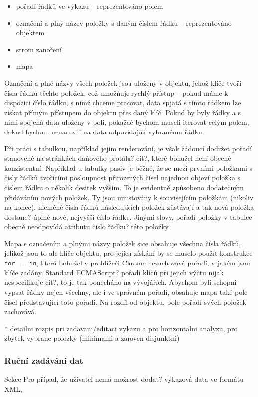 \begin{itemize}
\item pořadí řádků ve výkazu -- reprezentováno polem
\item označení a plný název položky s daným číslem řádku -- reprezentováno objektem
\item strom zanoření
\item mapa 
\end{itemize} 

Označení a plné názvy všech položek jsou uloženy v objektu, jehož klíče tvoří čísla řádků těchto položek, což umožňuje rychlý přístup -- pokud máme k dispozici číslo řádku, s nímž chceme pracovat, data spjatá s tímto řádkem lze získat přímým přístupem do objektu přes daný klíč. Pokud by byly řádky a s nimi spojená data uloženy v poli, pokaždé bychom museli iterovat celým polem, dokud bychom nenarazili na data odpovídající vybranému řádku.

Při práci s tabulkou, například jejím renderování, je však žádoucí dodržet pořadí stanovené na stránkách daňového protálu? cit?, které bohužel není obecně konzistentní. Například u tabulky pasiv je běžné, že se mezi prvními položkami s čísly řádků tvořícími posloupnost přirozených čísel najednou objeví položka s číslem řádku o několik desitek vyšším. To je evidentně způsobeno dodatečným přidáváním nových položek. Ty jsou umisťovány k souvisejícím položkám (nikoliv na konec), nicméně čísla řádků následujících položek zůstávají a tak nová položka dostane? úplně nové, nejvyšší číslo řádku. Jinými slovy, pořadí položky v tabulce obecně neodpovídá atributu číslo řádku? této položky. 


Mapa s označením a plnými názvy položek sice obsahuje všechna čísla řádků, jelikož jsou to ale klíče objektu, pro jejich získání by se muselo použít konstrukce \texttt{for .. in}, která bohužel v prohlížeči Chrome nezachovává pořadí, v jakém jsou klíče zadány. Standard ECMAScript? pořadí klíčů při jejich výčtu nijak nespecifikuje cit?, to je tak ponecháno na vývojářích. Abychom byli schopni vypsat řádky nejen všechny, ale i ve správném pořadí, obsahuje mapa také pole čísel představující toto pořadí. Na rozdíl od objektu, pole pořadí svých položek zachovává.

* detailni rozpis pri zadavani/editaci vykazu a pro horizontalni analyzu, pro zbytek vybrane polozky (minimalni a zaroven disjunktni)

\subsubsection{Ruční zadávání dat}
Sekce
Pro případ, že uživatel nemá možnost dodat? výkazová data ve formátu XML,



